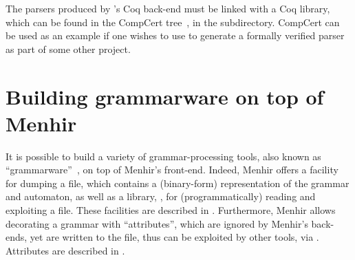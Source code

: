 \documentclass[onecolumn,11pt,nocopyrightspace,preprint]{sigplanconf}
\begin{document}


The parsers produced by \menhir's Coq back-end must be linked with a Coq
library, which can be found in the CompCert tree~\cite{compcert,compcert-github}, in the
subdirectory. CompCert can be used as
an example if one wishes to use \menhir to generate a formally verified parser
as part of some other project.

\begin{comment}
(* Int31 *)
Extract Inductive Int31.digits => "bool" [ "false" "true" ].
Extract Inductive Int31.int31 => "int" [ "Camlcoq.Int31.constr" ] "Camlcoq.Int31.destr".
Extract Constant Int31.twice => "Camlcoq.Int31.twice".
Extract Constant Int31.twice_plus_one => "Camlcoq.Int31.twice_plus_one".
Extract Constant Int31.compare31 => "Camlcoq.Int31.compare".
Extract Constant Int31.On => "0".
Extract Constant Int31.In => "1".
\end{comment}


\section{Building grammarware on top of Menhir}
\label{sec:grammarware}

It is possible to build a variety of grammar-processing tools,
also known as ``grammarware''~\cite{klint-laemmel-verhoef-05},
on top of Menhir's front-end. Indeed, Menhir offers a facility
for dumping a \cmly file, which contains a (binary-form) representation
of the grammar and automaton,
as well as a library, \menhirsdk,
for (programmatically) reading and exploiting a \cmly file.
These facilities are described in .
%
Furthermore, Menhir allows decorating a grammar with ``attributes'',
which are ignored by Menhir's back-ends,
yet are written to the \cmly file,
thus can be exploited by other tools, via \menhirsdk.
%
Attributes are described in .
\end{document}
